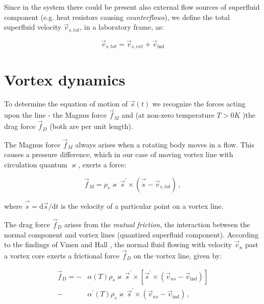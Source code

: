 Since in the system there could be present also external flow sources of superfluid component (e.g. heat resistors causing \textit{counterflows}), we define the total superfluid velocity $\vec{v}_{s,tot}$, in a laboratory frame, as:

\begin{equation}
\vec{v}_{s,tot} = \vec{v}_{s,ext} + \vec{v}_{\text{ind}}
\end{equation}

\newpage



\section{Vortex dynamics}

To determine the equation of motion of $\vec{s}(t)$ we recognize the forces acting upon the line - the Magnus force $\vec{f}_M$ and (at non-zero temperature $T>0\unit{K}$ )the drag force $\vec{f}_D$ (both are per unit length).

The Magnus force $\vec{f}_M$ always arises when a rotating body moves in a flow. This causes a pressure difference, which in our case of moving vortex line with circulation quantum $\varkappa$, exerts a force:

\begin{equation}
\vec{f}_M = \rho_s \varkappa \,\vec{s}^{\prime} \times (\vec{\dot{s}} - \vec{v}_{s,tot})\,,
\label{magnus}
\end{equation}

where $\vec{\dot{s}} = \text{d}\vec{s} / \text{d} t$ is the velocity of a particular point on a vortex line.

The drag force $\vec{f}_D$ arises from the \textit{mutual friction}, the interaction between the normal component and vortex lines (quantized superfluid component). According to the findings of Vinen and Hall \cite{vinen}, the normal fluid flowing with velocity $\vec{v}_n$ past a vortex core exerts a frictional force $\vec{f}_D$ on the vortex line, given by:

\begin{align}
\vec{f}_D = -& \alpha(T)\rho_s\varkappa\,\vec{s}^{\prime} \times [\vec{s}^{\prime} \times (\vec{v}_{ns} - \vec{v}_{\text{ind}})]
\label{alpha1}
\\
-& \alpha^{\prime}(T)\rho_s\varkappa\,\vec{s}^{\prime} \times (\vec{v}_{ns} - \vec{v}_{\text{ind}})
\,,
\label{alpha2}
\end{align}

